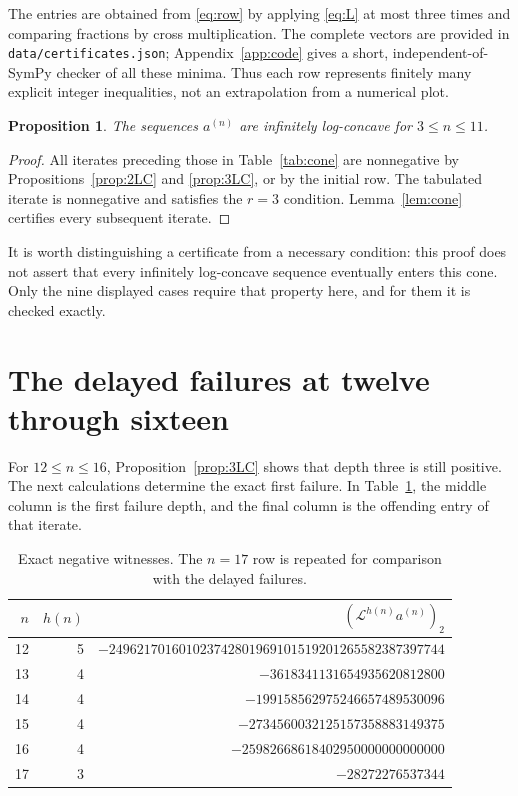 \documentclass[11pt,a4paper]{article}
\newtheorem{proposition}[theorem]{Proposition}
\theoremstyle{definition}
\newcommand{\Lop}{\mathcal L}
\newcommand{\aco}{a^{(n)}}
\begin{document}
The entries are obtained from \eqref{eq:row} by applying \eqref{eq:L}
at most three times and comparing fractions by cross multiplication.
The complete vectors are provided in \texttt{data/certificates.json};
Appendix~\ref{app:code} gives a short, independent-of-SymPy checker of
all these minima. Thus each row represents finitely many explicit integer
inequalities, not an extrapolation from a numerical plot.

\begin{proposition}\label{prop:small}
The sequences $\aco$ are infinitely log-concave for $3\le n\le11$.
\end{proposition}
\begin{proof}
All iterates preceding those in Table~\ref{tab:cone} are nonnegative by
Propositions~\ref{prop:2LC} and \ref{prop:3LC}, or by the initial row.
The tabulated iterate is nonnegative and satisfies the $r=3$ condition.
Lemma~\ref{lem:cone} certifies every subsequent iterate.
\end{proof}

It is worth distinguishing a certificate from a necessary condition:
this proof does not assert that every infinitely log-concave sequence
eventually enters this cone. Only the nine displayed cases require that
property here, and for them it is checked exactly.

\section{The delayed failures at twelve through sixteen}\label{sec:late}

For $12\le n\le16$, Proposition~\ref{prop:3LC} shows that depth three is
still positive. The next calculations determine the exact first
failure. In Table~\ref{tab:failures}, the middle column is the first
failure depth, and the final column is the offending entry of that
iterate.

\begin{table}[htbp]
\centering
\small
\begin{tabular}{@{}rrr@{}}
\toprule
$n$ & $h(n)$ & $(\Lop^{h(n)}\aco)_2$\\
\midrule
12 & 5 & $-249621701601023742801969101519201265582387397744$\\
13 & 4 & $-3618341131654935620812800$\\
14 & 4 & $-199158562975246657489530096$\\
15 & 4 & $-2734560032125157358883149375$\\
16 & 4 & $-25982668618402950000000000000$\\
17 & 3 & $-28272276537344$\\
\bottomrule
\end{tabular}
\caption{Exact negative witnesses. The $n=17$ row is repeated for
comparison with the delayed failures.}
\label{tab:failures}
\end{table}
\end{document}
